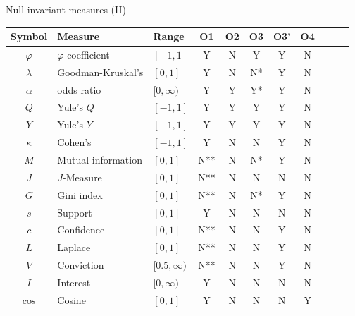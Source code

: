 \documentclass[aspectratio=169,t,xcolor=dvipsnames]{beamer}
\begin{document}
  {
    \begin{frame}{Null-invariant measures (II)}
      \centering
      \begin{tabular}{|c|l|l|c|c|c|c|c|c|c|c|}
        \hline
        \textbf{Symbol} & \textbf{Measure} & \textbf{Range} & \textbf{O1} & \textbf{O2} & \textbf{O3} & \textbf{O3'} & \textbf{O4} \\\hline
        $\varphi$ & $\varphi$-coefficient & $[-1,1]$ & Y & N & Y & Y & N \\
        $\lambda$ & Goodman-Kruskal's & $[0,1]$ & Y & N & N* & Y & N \\
        $\alpha$ & odds ratio & $[0,\infty)$ & Y & Y & Y* & Y & N \\
        $Q$ & Yule's $Q$ & $[-1,1]$ & Y & Y & Y & Y & N \\
        $Y$ & Yule's $Y$ & $[-1,1]$ & Y & Y & Y & Y & N \\
        $\kappa$ & Cohen's & $[-1,1]$ & Y & N & N & Y & N \\
        $M$ & Mutual information & $[0,1]$ & N** & N & N* & Y & N \\
        $J$ & $J$-Measure & $[0,1]$ & N** & N & N & N & N \\
        $G$ & Gini index & $[0,1]$ & N** & N & N* & Y & N \\
        $s$ & Support & $[0,1]$ & Y & N & N & N & N \\
        {\color{red}$c$} & {\color{red}Confidence} & {\color{red}$[0,1]$} & {\color{red}N**} & {\color{red}N} & {\color{red}N} & {\color{red}Y} & {\color{red}N} \\
        $L$ & Laplace & $[0,1]$ & N** & N & N & Y & N \\
        $V$ & Conviction & $[0.5,\infty)$ & N** & N & N & Y & N \\
        $I$ & Interest & $[0,\infty)$ & Y & N & N & N & N \\
        {\color{red}$\cos$} & {\color{red}Cosine} & {\color{red}$[0,1]$} & {\color{red}Y} & {\color{red}N} & {\color{red}N} & {\color{red}N} & {\color{red}Y} \\\hline
      \end{tabular}
    \end{frame}
  }
\end{document}
